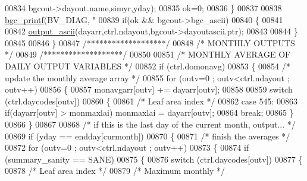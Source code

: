 \begin{DoxyCode}
{{{{{{{{{{{{{{{{{{{{{{{{{{{{{{{{{{{{{{{{00834                         bgcout->dayout.name,simyr,yday);
00835                     ok=0;
00836                 \}
00837                 
00838                 \hyperlink{bgc__io_8c_af287cce6e2aede1ce337de9319e80d0d}{bgc\_printf}(BV\_DIAG, \textcolor{stringliteral}{"%
00839                 \textcolor{keywordflow}{if}(ok && bgcout->bgc\_ascii)
00840                 \{   
00841                 
00842                     \hyperlink{output__ascii_8c_a2d026e2a6b7b7727a322ea7e0d43bec7}{output\_ascii}(dayarr,ctrl.ndayout,bgcout->dayoutascii.ptr);
00843                 
00844                 \}
00845                 
00846             \}
00847             \textcolor{comment}{/*******************/}
00848             \textcolor{comment}{/* MONTHLY OUTPUTS */}
00849             \textcolor{comment}{/*******************/}
00850             
00851             \textcolor{comment}{/* MONTHLY AVERAGE OF DAILY OUTPUT VARIABLES */}
00852             \textcolor{keywordflow}{if} (ctrl.domonavg)
00853             \{
00854                 \textcolor{comment}{/* update the monthly average array */}
00855                 \textcolor{keywordflow}{for} (outv=0 ; outv<ctrl.ndayout ; outv++)
00856                 \{
00857                     monavgarr[outv] += dayarr[outv];
00858 
00859                     \textcolor{keywordflow}{switch} (ctrl.daycodes[outv])
00860                     \{
00861                         \textcolor{comment}{/* Leaf area index */}
00862                         \textcolor{keywordflow}{case} 545:   
00863                             \textcolor{keywordflow}{if}(dayarr[outv] > monmaxlai) monmaxlai = dayarr[outv]; 
00864                             \textcolor{keywordflow}{break};
00865                     \}
00866                 \}
00867                 
00868                 \textcolor{comment}{/* if this is the last day of the current month, output... */}
00869                 \textcolor{keywordflow}{if} (yday == endday[curmonth])
00870                 \{
00871                     \textcolor{comment}{/* finish the averages */}
00872                     \textcolor{keywordflow}{for} (outv=0 ; outv<ctrl.ndayout ; outv++)
00873                     \{
00874                         \textcolor{keywordflow}{if} (summary\_sanity == SANE)
00875                         \{
00876                             \textcolor{keywordflow}{switch} (ctrl.daycodes[outv])
00877                             \{
00878                                 \textcolor{comment}{/* Leaf area index */}
00879                                 \textcolor{comment}{/* Maximum monthly */}
}}}}}}}}}}}}}}}}}}}}}}}}}}}}}}}}}}}}}}}}}
\end{DoxyCode}
